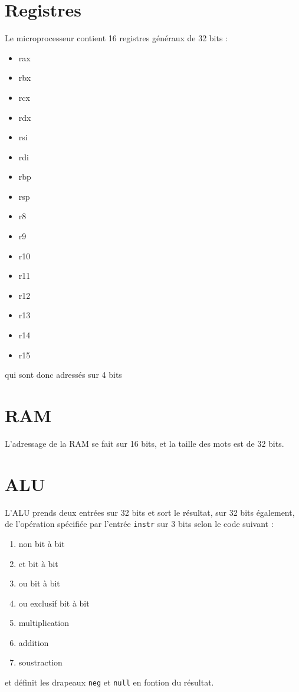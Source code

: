 \documentclass{article}
\begin{document}
    \section{Registres}
    Le microprocesseur contient 16 registres généraux de 32 bits :
    \begin{multicols}{2}
     \begin{itemize}
        \item rax
        \item rbx
        \item rcx
        \item rdx
        \item rsi
        \item rdi
        \item rbp
        \item rsp
        \item r8
        \item r9
        \item r10
        \item r11
        \item r12
        \item r13
        \item r14
        \item r15
    \end{itemize}
    \end{multicols}
    qui sont donc adressés sur 4 bits

    \section{RAM}
    L'adressage de la RAM se fait sur 16 bits,
    et la taille des mots est de 32 bits.

    \section{ALU}
    L'ALU prends deux entrées sur 32 bits et sort le résultat, sur 32 bits également, de l'opération spécifiée
    par l'entrée \texttt{instr} sur 3 bits selon le code suivant :
    \begin{multicols}{2}
    \begin{enumerate}
        \item non bit à bit
        \item et bit à bit
        \item ou bit à bit
        \item ou exclusif bit à bit
        \item multiplication
        \item addition
        \item soustraction
    \end{enumerate}
    \end{multicols}
    et définit les drapeaux \texttt{neg} et \texttt{null} en fontion du résultat.
\end{document}
